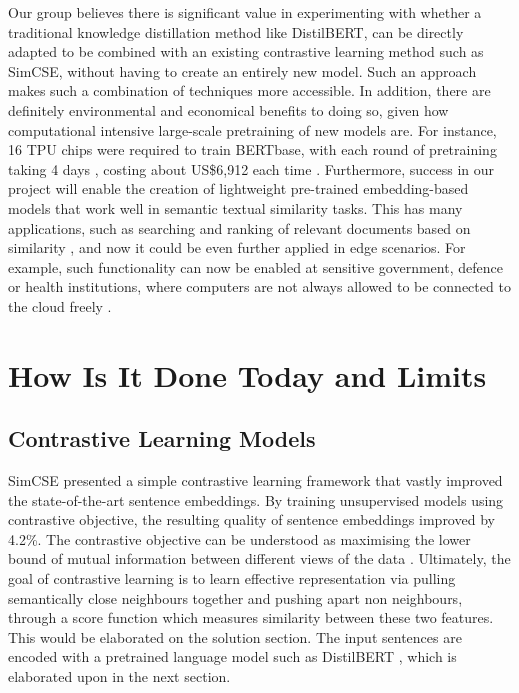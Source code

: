 \documentclass[10pt,twocolumn,letterpaper]{article}
\begin{document}
Our group believes there is significant value in experimenting with whether a traditional knowledge distillation method like DistilBERT, can be directly adapted to be combined with an existing contrastive learning method such as SimCSE, without having to create an entirely new model. Such an approach makes such a combination of techniques more accessible. In addition, there are definitely environmental and economical benefits to doing so, given how computational intensive large-scale pretraining of new models are. For instance, 16 TPU chips were required to train BERTbase, with each round of pretraining taking 4 days \cite{1810.04805}, costing about US\$6,912 each time \cite{cost.sota.ai}. Furthermore, success in our project will enable the creation of lightweight pre-trained embedding-based models that work well in semantic textual similarity tasks. This has many applications, such as searching and ranking of relevant documents based on similarity \cite{robust.sts}, and now it could be even further applied in edge scenarios. For example, such functionality can now be enabled at sensitive government, defence or health institutions, where computers are not always allowed to be connected to the cloud freely \cite{1910.01108}.

\section{How Is It Done Today and Limits}

\subsection{Contrastive Learning Models}

SimCSE \cite{2104.08821} presented a simple contrastive learning framework that vastly improved the state-of-the-art sentence embeddings. By training unsupervised models using contrastive objective, the resulting quality of sentence embeddings improved by 4.2\%. The contrastive objective can be understood as maximising the lower bound of mutual information between different views of the data \cite{1808.06670}. Ultimately, the goal of contrastive learning is to learn effective representation via pulling semantically close neighbours together and pushing apart  non neighbours,  through a score function which measures similarity between these two features. This would be elaborated on the solution section. The input sentences are encoded with a pretrained language model such as DistilBERT , which is elaborated upon in the next section.
\end{document}
